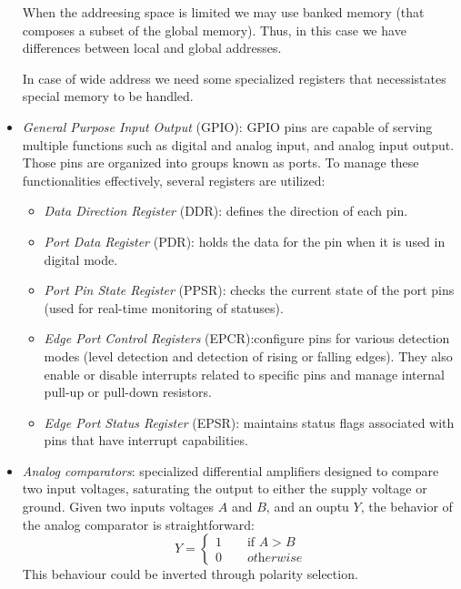 \begin{itemize}
        When the addreesing space is limited we may use banked memory (that composes a subset of the global memory). 
        Thus, in this case we have differences between local and global addresses. 

        In case of wide address we need some specialized registers that necessistates special memory to be handled. 
    \item \textit{General Purpose Input Output} (GPIO): GPIO pins are capable of serving multiple functions such as digital and analog input, and  analog input output. 
        Those pins are organized into groups known as ports. 
        To manage these functionalities effectively, several registers are utilized:
        \begin{itemize}
            \item \textit{Data Direction Register} (DDR): defines the direction of each pin.
            \item \textit{Port Data Register} (PDR): holds the data for the pin when it is used in digital mode.
            \item \textit{Port Pin State Register} (PPSR): checks the current state of the port pins (used for real-time monitoring of statuses).
            \item \textit{Edge Port Control Registers} (EPCR):configure pins for various detection modes (level detection and detection of rising or falling edges). 
                They also enable or disable interrupts related to specific pins and manage internal pull-up or pull-down resistors.
            \item \textit{Edge Port Status Register} (EPSR): maintains status flags associated with pins that have interrupt capabilities.
        \end{itemize}
    \item \textit{Analog comparators}: specialized differential amplifiers designed to compare two input voltages, saturating the output to either the supply voltage or ground. 
        Given two inputs voltages $A$ and $B$, and an ouptu $Y$, the behavior of the analog comparator is straightforward:
        \[Y=\begin{cases} 1 \qquad\text{if } A> B \\ 0 \qquad\textit{otherwise} \end{cases}\]
        This behaviour could be inverted through polarity selection. 


\end{itemize}
